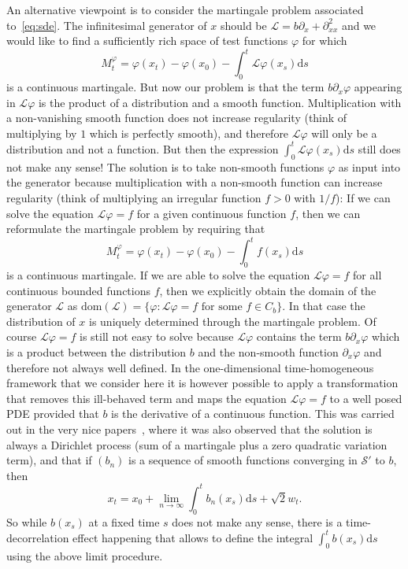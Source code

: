 \documentclass[a4paper,11pt]{article}
\newcommand{\CS}{\mathscr{S}}
\newcommand{\LL}{\mathcal{L}}
\newcommand{\1}{\mathds{1}}
\newcommand{\dd}{\mathrm{d}}
\begin{document}
  An alternative viewpoint is to consider the martingale problem associated to~\eqref{eq:sde}. The infinitesimal generator of $x$ should be $\LL = b \partial_x + \partial_{xx}^2$ and we would like to find a sufficiently rich space of test functions $\varphi$ for which
  \[
     M^\varphi_t = \varphi(x_t) - \varphi(x_0) - \int_0^t \LL \varphi(x_s) \dd s
  \]
  is a continuous martingale. But now our problem is that the term $b \partial_x \varphi$ appearing in $\LL \varphi$ is the product of a distribution and a smooth function. Multiplication with a non-vanishing smooth function does not increase regularity (think of multiplying by $1$ which is perfectly smooth), and therefore $\LL \varphi$ will only be a distribution and not a function. But then the expression $ \int_0^t \LL \varphi(x_s) \dd s$ still does not make any sense! The solution is to take non-smooth functions $\varphi$ as input into the generator because multiplication with a non-smooth function can increase regularity (think of multiplying an irregular function $f > 0$ with $1/f$): If we can solve the equation $\LL \varphi = f$ for a given continuous function $f$, then we can reformulate the martingale problem by requiring that
  \[
     M^\varphi_t = \varphi(x_t) - \varphi(x_0) - \int_0^t f(x_s) \dd s
  \]
  is a continuous martingale. If we are able to solve the equation $\LL \varphi = f$ for all continuous bounded functions $f$, then we explicitly obtain the domain of the generator $\LL$ as $\mathrm{dom}(\LL) = \{ \varphi: \LL \varphi = f \text{ for some } f \in C_b\}$. In that case the distribution of $x$ is uniquely determined through the martingale problem. Of course $\LL \varphi = f$  is still not easy to solve because $\LL \varphi$ contains the term $b \partial_x \varphi$ which is a product between the distribution $b$ and the non-smooth function $\partial_x \varphi$ and therefore not always well defined. In the one-dimensional time-homogeneous framework that we consider here it is however possible to apply a transformation that removes this ill-behaved term and maps the equation $\LL \varphi = f$ to a well posed PDE provided that $b$ is the derivative of a continuous function. This was carried out in the very nice papers~\cite{FRW03, FRW04}, where it was also observed that the solution is always a Dirichlet process (sum of a martingale plus a zero quadratic variation term), and that if $(b_n)$ is a sequence of smooth functions converging in $\CS'$ to $b$, then
  \begin{equation}\label{eq:martingale-approx}
     x_t = x_0 + \lim_{n \to \infty} \int_0^t b_n(x_s) \dd s + \sqrt{2} w_t.
  \end{equation}
  So while $b(x_s)$ at a fixed time $s$ does not make any sense, there is a time-decorrelation effect happening that allows to define the integral $\int_0^t b(x_s) \dd s$ using the above limit procedure.
  
\end{document}

